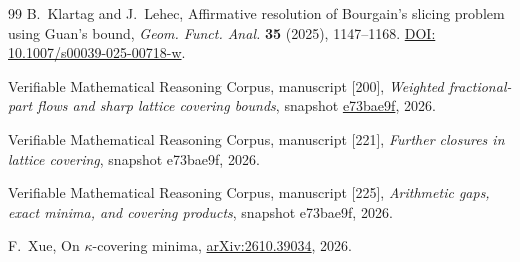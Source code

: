 \documentclass[11pt]{article}
\begin{document}
\begin{thebibliography}{99}
B.~Klartag and J.~Lehec, Affirmative resolution of Bourgain's slicing
problem using Guan's bound, \emph{Geom. Funct. Anal.}
\textbf{35} (2025), 1147--1168.
\href{https://doi.org/10.1007/s00039-025-00718-w}{DOI: 10.1007/s00039-025-00718-w}.

Verifiable Mathematical Reasoning Corpus, manuscript [200],
\emph{Weighted fractional-part flows and sharp lattice covering bounds}, snapshot
\href{https://github.com/QEEDDD/Verifiable-Mathematical-Reasoning-Corpus/tree/e73bae9fd0c319129b19aacc5c317f7abf2865ef}{e73bae9f},
2026.

Verifiable Mathematical Reasoning Corpus, manuscript [221],
\emph{Further closures in lattice covering},
snapshot e73bae9f, 2026.

Verifiable Mathematical Reasoning Corpus, manuscript [225],
\emph{Arithmetic gaps, exact minima, and covering products},
snapshot e73bae9f, 2026.

F.~Xue, On \(\kappa\)-covering minima,
\href{https://arxiv.org/abs/2610.39034}{arXiv:2610.39034}, 2026.

\end{thebibliography}
\end{document}
